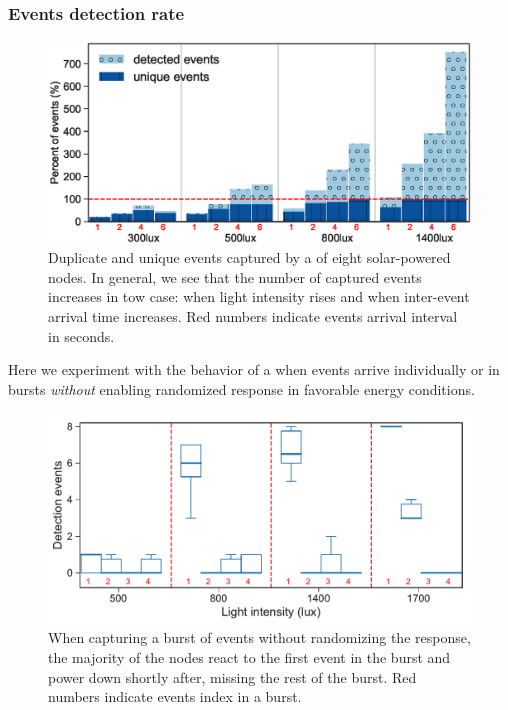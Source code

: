 \subsubsection{Events detection rate}
%
\begin{figure}[t!]
		\centering
	    \includegraphics[width=\columnwidth]{figures/regular_events_capture_rate.eps}
		\caption{Duplicate and unique events captured by a \fullcim of eight solar-powered nodes. In general, we see that the number of captured events increases in tow case: when light intensity rises and when inter-event arrival time increases. 
         Red numbers indicate events arrival interval in seconds.
         }
    	\label{fig:events_detection_rate}
\end{figure} 
Here we experiment with the behavior of a \cis when events arrive individually or in bursts \emph{without} enabling  randomized response in favorable energy conditions. 
%
\begin{figure}[t]
    \includegraphics[width=\columnwidth]{figures/events_burst_problem}
	\caption{When capturing a burst of events without randomizing the response, the majority of the nodes react to the first event in the burst and power down shortly after, missing the rest of the burst. Red numbers indicate events index in a burst.}
    \label{fig:events_burst_problem}
\end{figure}
%
